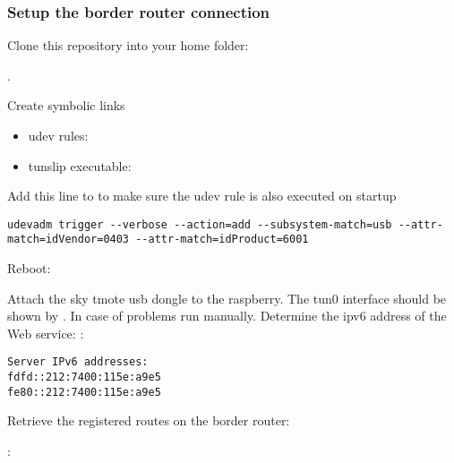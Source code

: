 \subsubsection{Setup the border router connection}\label{setup-the-border-router-connection}

Clone this repository into your home folder:

.

Create symbolic links

\begin{itemize}
	\item{udev rules: }
	\item{tunslip executable:\\
		}
\end{itemize}

Add this line to  to make sure the udev rule is also executed on startup

\noindent
\begin{minipage}{\linewidth}
	\begin{lstlisting}[numbers=none]
udevadm trigger --verbose --action=add --subsystem-match=usb --attr-match=idVendor=0403 --attr-match=idProduct=6001
	\end{lstlisting}
\end{minipage}

Reboot: 

Attach the sky tmote usb dongle to the raspberry. The tun0 interface should be shown by .
In case of problems run 
manually.
Determine the ipv6 address of the Web service:
:

\noindent
\begin{minipage}{\linewidth}
	\begin{lstlisting}[numbers=none]
Server IPv6 addresses:
fdfd::212:7400:115e:a9e5
fe80::212:7400:115e:a9e5
	\end{lstlisting}
\end{minipage}

Retrieve the registered routes on the border router:

:

